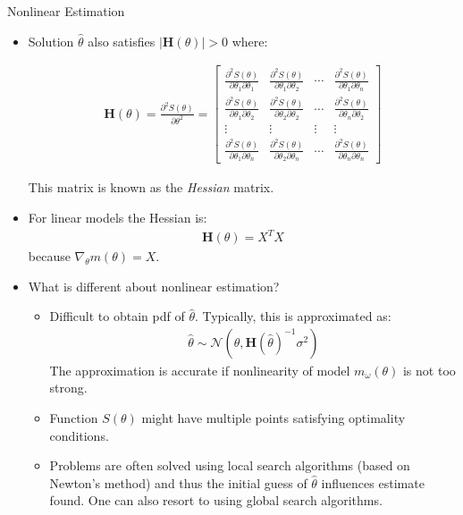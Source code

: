 \documentclass[9pt]{beamer}
\begin{document}
%
\begin{frame}{Nonlinear Estimation}

\begin{itemize}
\item Solution $\hat{\theta}$ also satisfies $|\mathbf{H}({\theta})|>0$ where:
\begin{footnotesize}
\begin{align*}
\mathbf{H}(\theta)=\frac{\partial^2 S(\theta)}{\partial \theta^2}=
\left[\begin{array}{ccccccccc}
\frac{\partial^2 S(\theta)}{\partial \theta_1\partial \theta_1}&\frac{\partial^2 S(\theta)}{\partial \theta_1\partial \theta_2}&\cdots& \frac{\partial^2 S(\theta)}{\partial \theta_1\partial \theta_n}\\
\frac{\partial^2 S(\theta)}{\partial \theta_1\partial \theta_2}&\frac{\partial^2 S(\theta)}{\partial \theta_2\partial \theta_2}&\cdots&\frac{\partial^2 S(\theta)}{\partial \theta_n\partial \theta_2}\\
\vdots & \vdots &\vdots &\vdots\\
\frac{\partial^2 S(\theta)}{\partial \theta_1\partial \theta_n}&\frac{\partial^2 S(\theta)}{\partial \theta_2\partial \theta_n}&\cdots& \frac{\partial^2 S(\theta)}{\partial \theta_n\partial \theta_n}
\end{array}\right]
\end{align*}
\end{footnotesize}
This matrix is known as the {\em Hessian} matrix. 
\item For linear models the Hessian is:
\begin{align*}
\mathbf{H}(\theta)=X^TX
\end{align*}
because  $\nabla_\theta m(\theta)=X$.  
\item What is different about nonlinear estimation?
\begin{itemize}
\item  Difficult to obtain pdf of $\hat{\theta}$. Typically, this is approximated as:
\begin{align*}
\hat{\theta}\sim\mathcal{N}(\theta,\mathbf{H}(\hat{\theta})^{-1}\sigma^2)
\end{align*}
The approximation is accurate if nonlinearity of model $m_\omega(\theta)$ is not too strong. 
\item Function $S(\theta)$ might have multiple points satisfying optimality conditions.  
\item Problems are often solved using local search algorithms (based on Newton's method) and thus the initial guess of $\hat{\theta}$ influences estimate found.  One can also resort to using global search algorithms. 
\end{itemize}
\end{itemize}
\end{frame}
\end{document}
